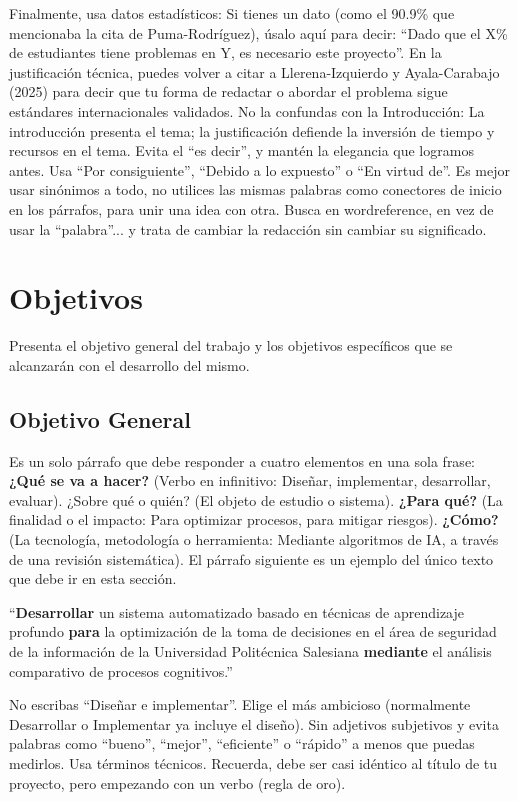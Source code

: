 \documentclass[12pt]{article}
\begin{document}
Finalmente, usa datos estadísticos: Si tienes un dato (como el 90.9\% que mencionaba la cita de Puma-Rodríguez), úsalo aquí para decir: ``Dado que el X\% de estudiantes tiene problemas en Y, es necesario este proyecto''. En la justificación técnica, puedes volver a citar a Llerena-Izquierdo y Ayala-Carabajo (2025) para decir que tu forma de redactar o abordar el problema sigue estándares internacionales validados.
No la confundas con la Introducción: La introducción presenta el tema; la justificación defiende la inversión de tiempo y recursos en el tema. Evita el ``es decir'', y mantén la elegancia que logramos antes. Usa ``Por consiguiente'', ``Debido a lo expuesto'' o ``En virtud de''.
Es mejor usar sinónimos a todo, no utilices las mismas palabras como conectores de inicio en los párrafos, para unir una idea con otra. Busca en wordreference, en vez de usar la ``palabra''... y trata de cambiar la redacción sin cambiar su significado.



\section{Objetivos}
{\color{magenta}Presenta el objetivo general del trabajo y los objetivos específicos que se alcanzarán con el desarrollo del mismo.}

\subsection{Objetivo General}
Es un solo párrafo que debe responder a cuatro elementos en una sola frase: {\color{red}\textbf{¿Qué se va a hacer?}} (Verbo en infinitivo: Diseñar, implementar, desarrollar, evaluar). ¿Sobre qué o quién? (El objeto de estudio o sistema). {\color{blue}\textbf{¿Para qué?}} (La finalidad o el impacto: Para optimizar procesos, para mitigar riesgos). {\color{green}\textbf{¿Cómo?}} (La tecnología, metodología o herramienta: Mediante algoritmos de IA, a través de una revisión sistemática). El párrafo siguiente es un ejemplo del único texto que debe ir en esta sección.

``{\color{red}\textbf{Desarrollar}} un sistema automatizado basado en técnicas de aprendizaje profundo {\color{blue}\textbf{para}} la optimización de la toma de decisiones en el área de seguridad de la información de la Universidad Politécnica Salesiana {\color{green}\textbf{mediante}} el análisis comparativo de procesos cognitivos.''

No escribas ``Diseñar e implementar''. Elige el más ambicioso (normalmente Desarrollar o Implementar ya incluye el diseño). Sin adjetivos subjetivos y evita palabras como ``bueno'', ``mejor'', ``eficiente'' o ``rápido'' a menos que puedas medirlos. Usa términos técnicos. Recuerda, debe ser casi idéntico al título de tu proyecto, pero empezando con un verbo (regla de oro).
\end{document}

